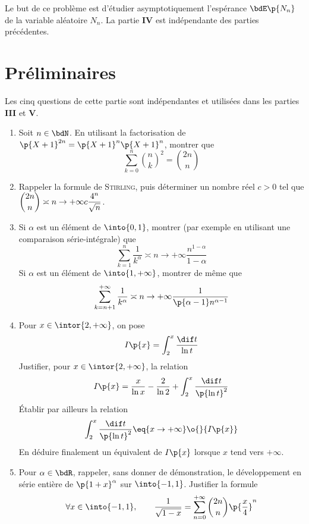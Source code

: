 \documentclass[a4paper,french,bookmarks]{article}
\begin{document}
    Le but de ce problème est d'étudier asymptotiquement l'espérance $\bdE\p{N_n}$ de la variable aléatoire $N_n$. La partie \textbf{\sffamily IV} est indépendante des parties précédentes.
    
    \section{Préliminaires}
    
    Les cinq questions de cette partie sont indépendantes et utilisées dans les parties \textbf{\sffamily III} et \textbf{\sffamily V}.
    
    \begin{enumerate}
        \item Soit $n \in \bdN$. En utilisant la factorisation de $\p{X + 1}^{2n} = \p{X + 1}^n\p{X + 1}^n$, montrer que
        \[ \sum_{k=0}^n \binom{n}{k}^2 = \binom{2n}{n}\]
        
        \item Rappeler la formule de \textsc{Stirling}, puis déterminer un nombre réel $c > 0$ tel que $\dbinom{2n}{n} \asymp{n \to +\infty} c \dfrac{4^n}{\sqrt{n}}$.
        
        \item Si $\alpha$ est un élément de $\into{0, 1}$, montrer (par exemple en utilisant une comparaison série-intégrale) que 
        \[ \sum_{k=1}^n \dfrac{1}{k^\alpha} \asymp{n \to +\infty} \dfrac{n^{1-\alpha}}{1 - \alpha}\]
        Si $\alpha$ est un élément de $\into{1, +\infty}$, montrer de même que
        \[ \sum_{k=n+1}^{+\infty} \dfrac{1}{k^\alpha} \asymp{n \to +\infty} \dfrac{1}{\p{\alpha - 1}n^{\alpha - 1}}\]
        
        \item Pour $x \in \intor{2, +\infty}$, on pose
        \[ I\p{x} = \int_2^x \dfrac{\dif t}{\ln t}\]
        Justifier, pour $x \in \intor{2, +\infty}$, la relation
        \[ I\p{x} = \dfrac{x}{\ln x} - \dfrac{2}{\ln 2} + \int_2^x \dfrac{\dif t}{\p{\ln t}^2}\]
        Établir par ailleurs la relation
        \[ \int_2^x \dfrac{\dif t}{\p{\ln t}^2} \eq{x \to +\infty} \o{}{I\p{x}}\]
        En déduire finalement un équivalent de $I\p{x}$ lorsque $x$ tend vers $+\infty$.
        
        \item Pour $\alpha \in \bdR$, rappeler, sans donner de démonstration, le développement en série entière de $\p{1 + x}^\alpha$ sur $\into{-1, 1}$. Justifier la formule
        \[ \forall x \in \into{-1, 1},\qquad \dfrac{1}{\sqrt{1 - x}} = \sum_{n = 0}^{+\infty} \binom{2n}{n} \p{\dfrac{x}{4}}^n\]
    \end{enumerate}
    
\end{document}

